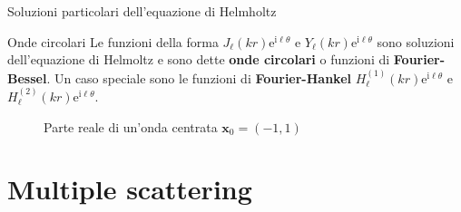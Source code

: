 \documentclass{beamer}
\newcommand{\bx}{{\mathbf x}}
\newcommand{\ri}{{\mathrm i}}
\newcommand{\re}{{\mathrm e}}
\begin{document}
	\begin{frame}{Soluzioni particolari dell'equazione di Helmholtz}
		\begin{small}
			\begin{block}{Onde circolari}
			Le funzioni della forma $J_\ell(kr)\re^{\ri \ell \theta}$ e $Y_\ell(kr)\re^{\ri \ell \theta}$ sono soluzioni dell'equazione di Helmoltz e sono dette \textbf{onde circolari} o funzioni di \textbf{Fourier-Bessel}. Un caso speciale sono le funzioni di \textbf{Fourier-Hankel} $H^{(1)}_\ell(kr)\re^{\ri \ell \theta}$ e $H^{(2)}_\ell(kr)\re^{\ri \ell \theta}$.
		\end{block}
		\begin{figure}
			\centering
			\hspace{-0.3cm}
			\caption{Parte reale di un'onda centrata $\bx_0 = (-1, 1)$}
		\end{figure}
		\end{small}
	\end{frame}
	
	\section{Multiple scattering}
	\sectionpage
	
\end{document}
